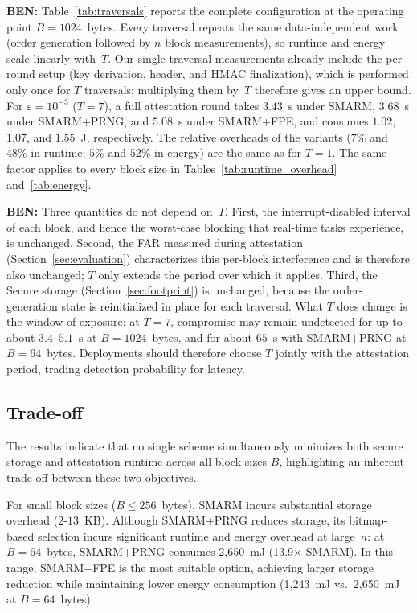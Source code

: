 \documentclass{ieeeaccess}
\DeclareRobustCommand{\ben}[1]{{\color{BENcolor}\textbf{BEN:} #1}}
\newcommand{\rtsmarmone}{SMARM+PRNG\xspace}
\newcommand{\rtsmarmtwo}{SMARM+FPE\xspace}
\begin{document}
\ben{Table~\ref{tab:traversals} reports the complete configuration at the operating point $B = 1024$~bytes.
Every traversal repeats the same data-independent work (order generation followed by $n$ block measurements), so runtime and energy scale linearly with~$T$.
Our single-traversal measurements already include the per-round setup (key derivation, header, and HMAC finalization), which is performed only once for $T$ traversals; multiplying them by~$T$ therefore gives an upper bound.
For $\varepsilon = 10^{-3}$ ($T = 7$), a full attestation round takes $3.43$~s under SMARM, $3.68$~s under \rtsmarmone, and $5.08$~s under \rtsmarmtwo, and consumes $1.02$, $1.07$, and $1.55$~J, respectively.
The relative overheads of the variants ($7\%$ and $48\%$ in runtime; $5\%$ and $52\%$ in energy) are the same as for $T = 1$.
The same factor applies to every block size in Tables~\ref{tab:runtime_overhead} and~\ref{tab:energy}.}

\ben{Three quantities do not depend on~$T$.
First, the interrupt-disabled interval of each block, and hence the worst-case blocking that real-time tasks experience, is unchanged.
Second, the FAR measured during attestation (Section~\ref{sec:evaluation}) characterizes this per-block interference and is therefore also unchanged; $T$ only extends the period over which it applies.
Third, the Secure storage (Section~\ref{sec:footprint}) is unchanged, because the order-generation state is reinitialized in place for each traversal.
What $T$ does change is the window of exposure: at $T = 7$, compromise may remain undetected for up to about $3.4$--$5.1$~s at $B = 1024$~bytes, and for about $65$~s with \rtsmarmone at $B = 64$~bytes.
Deployments should therefore choose $T$ jointly with the attestation period, trading detection probability for latency.}


\subsection{Trade-off}
The results indicate that no single scheme simultaneously minimizes both secure storage and attestation runtime across all block sizes $B$, highlighting an inherent trade-off between these two objectives.

For small block sizes ($B \leq 256$~bytes), SMARM incurs 
substantial storage overhead ($2$-$13$~KB). Although 
\rtsmarmone reduces storage, its bitmap-based selection 
incurs significant runtime and energy overhead at large~$n$: 
at $B = 64$~bytes, \rtsmarmone consumes 2{,}650~mJ 
(13.9$\times$ SMARM). In this range, \rtsmarmtwo is the 
most suitable option, achieving larger storage reduction 
while maintaining lower energy consumption (1{,}243~mJ 
vs.\ 2{,}650~mJ at $B = 64$~bytes).
\end{document}
